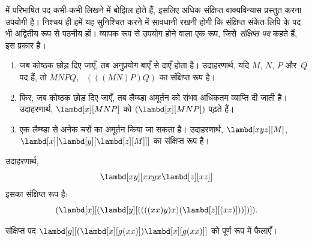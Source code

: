 \documentclass[../../../include/open-logic-section]{subfiles}
\begin{document}

 में परिभाषित पद कभी-कभी लिखने में बोझिल होते हैं,
इसलिए अधिक संक्षिप्त वाक्यविन्यास प्रस्तुत करना उपयोगी है। निश्चय ही हमें
यह सुनिश्चित करने में सावधानी रखनी होगी कि संक्षिप्त संकेत-लिपि के पद भी
अद्वितीय रूप से पठनीय हों। व्यापक रूप से उपयोग होने वाला एक रूप, जिसे
\emph{संक्षिप्त पद} कहते हैं, इस प्रकार है।

\begin{enumerate}
\item जब कोष्ठक छोड़ दिए जाएँ, तब अनुप्रयोग बाएँ से दाएँ होता है।
  उदाहरणार्थ, यदि $M$, $N$, $P$ और~$Q$ पद हैं, तो $MNPQ$,
  ~$(((MN)P)Q)$ का संक्षिप्त रूप है।
\item फिर, जब कोष्ठक छोड़ दिए जाएँ, तब लैम्ब्डा अमूर्तन को संभव अधिकतम
  व्याप्ति दी जाती है। उदाहरणार्थ, $\lambd[x][MNP]$ को
  $(\lambd[x][MNP])$ पढ़ते हैं।
\item एक लैम्ब्डा से अनेक चरों का अमूर्तन किया जा सकता है। उदाहरणार्थ,
  $\lambd[xyz][M]$, ~$\lambd[x][\lambd[y][\lambd[z][M]]]$ का संक्षिप्त रूप
  है।
\end{enumerate}

उदाहरणार्थ,
\[
\lambd[xy][xxyx \lambd[z][xz]]
\]
इसका संक्षिप्त रूप है:
\[
(\lambd[x][(\lambd[y][((((xx)y)x)(\lambd[z][(xz)]))])]).
\]

\begin{prob}
संक्षिप्त पद $\lambd[g][(\lambd[x][g (x x)])
  \lambd[x][g (x x)]]$ को पूर्ण रूप में फैलाएँ।
\end{prob}
\end{document}
